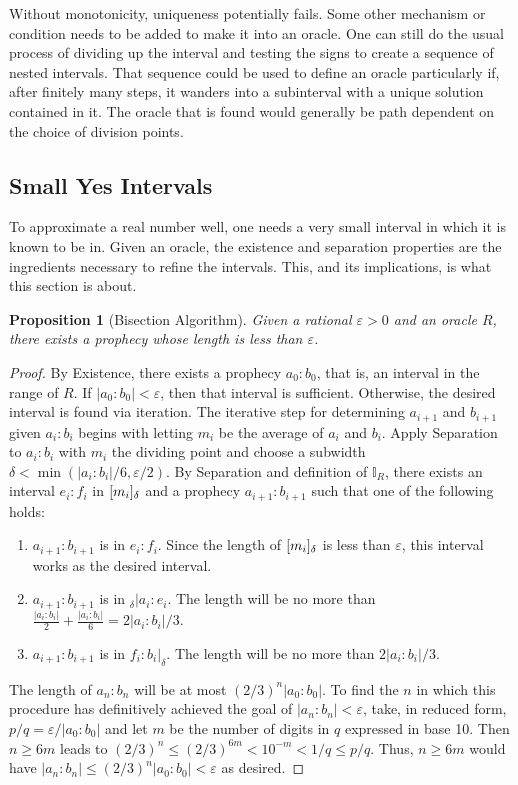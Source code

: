 \documentclass[12pt]{article}
\newtheorem{proposition}{Proposition}[section]
\begin{document}
Without monotonicity, uniqueness potentially fails. Some other mechanism or condition needs to be added to make it into an oracle. One can still do the usual process of dividing up the interval and testing the signs to create a sequence of nested intervals. That sequence could be used to define an oracle particularly if, after finitely many steps, it wanders into a subinterval with a unique solution contained in it. The oracle that is found would generally be path dependent on the choice of division points. 

\subsection{Small Yes Intervals}

To approximate a real number well, one needs a very small interval in which it is known to be in. Given an oracle, the existence and separation properties are the ingredients necessary to refine the intervals. This, and its implications, is what this section is about. 


\begin{proposition}[Bisection Algorithm]
    Given a rational $\varepsilon >0$ and an oracle $R$, there exists a prophecy whose length is less than $\varepsilon$.
\end{proposition}

\begin{proof}
    By Existence, there exists a prophecy $a_0:b_0$, that is, an interval in the range of $R$. If $|a_0:b_0| < \varepsilon$, then that interval is sufficient. Otherwise, the desired interval is found via iteration. The iterative step for determining $a_{i+1}$ and $b_{i+1}$ given $a_i:b_i$ begins with letting $m_i$ be the average of $a_i$ and $b_i$. Apply Separation to $a_i:b_i$ with $m_i$ the dividing point and choose a subwidth $\delta < \min(|a_i:b_i|/6, \varepsilon /2)$. By Separation and definition of $\mathbb{I}_R$, there exists an interval $e_i:f_i$ in $[m_i]_{\delta}$ and a prophecy $a_{i+1}:b_{i+1}$ such that one of the following holds: 
    \begin{enumerate}
        \item $a_{i+1}:b_{i+1}$ is in $e_i:f_i$. Since the length of $[m_i]_{\delta}$ is less than $\varepsilon$, this interval works as the desired interval.  
        \item  $a_{i+1}:b_{i+1}$ is in ${}_\delta|a_i :e_i$. The length will be no more than $\frac{|a_i:b_i|}{2}  + \frac{|a_i:b_i|}{6} = 2|a_i:b_i|/3$.
        \item  $a_{i+1}:b_{i+1}$ is in $f_i:b_i|_\delta$. The length will be no more than $2|a_i:b_i|/3$.
    \end{enumerate}
    The length of $a_n:b_n$ will be at most $(2/3)^n |a_0:b_0|$. To find the $n$ in which this procedure has definitively achieved the goal of $|a_n:b_n|<\varepsilon$,  take, in reduced form, $p/q = \varepsilon/|a_0:b_0|$ and let $m$ be the number of digits in $q$ expressed in base 10. Then $n \geq  6m$ leads to  $(2/3)^n \leq (2/3)^{6m} < 10^{-m} < 1/q \leq p/q$. Thus, $n \geq 6m$ would have $|a_n:b_n| \leq (2/3)^n |a_0:b_0| < \varepsilon$ as desired. 
\end{proof}
\end{document}

